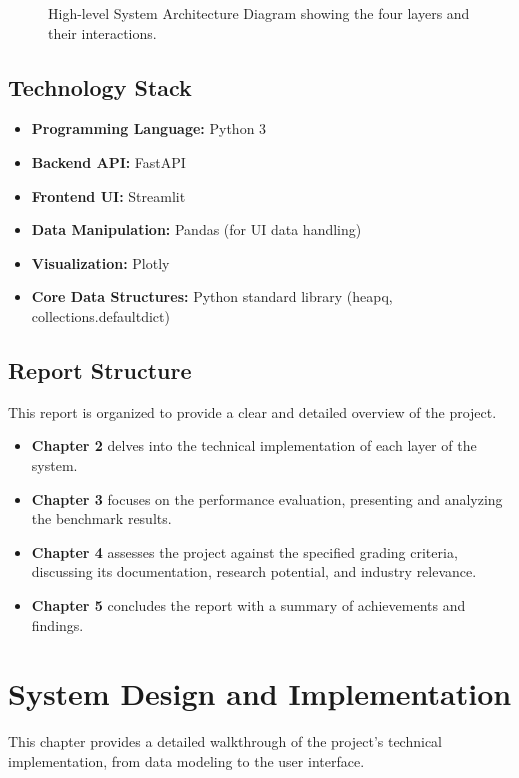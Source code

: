 \documentclass[12pt, a4paper]{report}
\begin{document}
\begin{figure}[h!]
    \centering
    \fbox{\rule{0pt}{4in}\rule{0.9\linewidth}{0pt}}
    \caption{High-level System Architecture Diagram showing the four layers and their interactions.}
    \label{fig:arch}
\end{figure}

\section{Technology Stack}
\begin{itemize}
    \item \textbf{Programming Language:} Python 3
    \item \textbf{Backend API:} FastAPI
    \item \textbf{Frontend UI:} Streamlit
    \item \textbf{Data Manipulation:} Pandas (for UI data handling)
    \item \textbf{Visualization:} Plotly
    \item \textbf{Core Data Structures:} Python standard library (heapq, collections.defaultdict)
\end{itemize}

\section{Report Structure}
This report is organized to provide a clear and detailed overview of the project.
\begin{itemize}
    \item \textbf{Chapter 2} delves into the technical implementation of each layer of the system.
    \item \textbf{Chapter 3} focuses on the performance evaluation, presenting and analyzing the benchmark results.
    \item \textbf{Chapter 4} assesses the project against the specified grading criteria, discussing its documentation, research potential, and industry relevance.
    \item \textbf{Chapter 5} concludes the report with a summary of achievements and findings.
\end{itemize}

\clearpage
\chapter{System Design and Implementation}

This chapter provides a detailed walkthrough of the project's technical implementation, from data modeling to the user interface.
\end{document}
